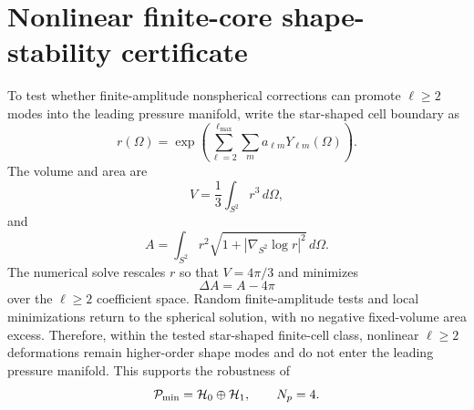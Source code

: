 \section{Nonlinear finite-core shape-stability certificate}
\label{app:nonlinear-shape-stability}

To test whether finite-amplitude nonspherical corrections can promote
\(\ell\ge2\) modes into the leading pressure manifold, write the star-shaped
cell boundary as
\[
  r(\Omega)=
  \exp\!\left(
  \sum_{\ell=2}^{\ell_{\max}}\sum_m a_{\ell m}Y_{\ell m}(\Omega)
  \right).
\]
The volume and area are
\[
  V=\frac13\int_{S^2}r^3\,d\Omega,
\]
and
\[
  A=\int_{S^2}
  r^2
  \sqrt{
  1+\left|\nabla_{S^2}\log r\right|^2
  }\,d\Omega .
\]
The numerical solve rescales \(r\) so that \(V=4\pi/3\) and minimizes
\[
  \Delta A=A-4\pi
\]
over the \(\ell\ge2\) coefficient space.  Random finite-amplitude tests and
local minimizations return to the spherical solution, with no negative
fixed-volume area excess.  Therefore, within the tested star-shaped
finite-cell class, nonlinear \(\ell\ge2\) deformations remain higher-order
shape modes and do not enter the leading pressure manifold.  This supports the
robustness of
\[
  \mathcal P_{\rm min}=\mathcal H_0\oplus\mathcal H_1,
  \qquad
  N_p=4.
\]
